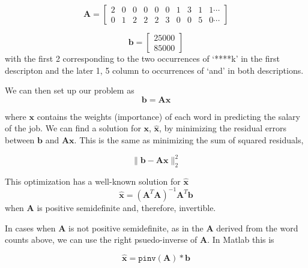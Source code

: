 \documentclass[12pt]{article}
\begin{document}
    \begin{equation*}
        \bm{A} = 
        \begin{bmatrix}
           2 & 0 & 0 & 0 & 0 & 0 & 1 & 3 & 1 & 1\cdots\\
	0 & 1 & 2 & 2 & 2 & 3 & 0 & 0 & 5 & 0\cdots
        \end{bmatrix}
    \end{equation*}
	
    \begin{equation*}
        \bm{b} = 
        \begin{bmatrix}
        25000\\
        85000
        \end{bmatrix}
    \end{equation*}
    with the first 2 corresponding to the two occurrences of `****k' in the first descripton and the later 1, 5 column to occurrences of `and' in both descriptions.


    We can then set up our problem as 
    \begin{equation}\label{eq:linsolve}
        \bm{b} = \bm{Ax}
    \end{equation}

    \noindent where $\bm{x}$ contains the weights (importance) of each word in
    predicting the salary of the job. We can find a solution for $\bm{x}$,
    $\bm{\hat{x}}$, by minimizing the residual errors between $\bm{b}$ and
    $\bm{Ax}$.  This is the same as minimizing the sum of squared residuals,

    \begin{equation}
        \|\bm{b} - \bm{Ax}\|^2_2
    \end{equation}

    \noindent This optimization has a well-known solution for $\bm{\hat{x}}$
    \begin{equation}
        \bm{\hat{x}} = (\bm{A}^{T}\bm{A})^{-1}\bm{A}^T\bm{b}
    \end{equation}
    when $\bm{A}$ is positive semidefinite and, therefore, invertible.
    
    In cases when $\bm{A}$ is not positive semidefinite, as in the $\bm{A}$
    derived from the word counts above, we can use the right psuedo-inverse of
    $\bm{A}$.  In Matlab this is 
    
    \begin{equation} 
        \bm{\hat{x}} = \texttt{pinv}(\bm{A})*\bm{b}
    \end{equation}
\end{document}
